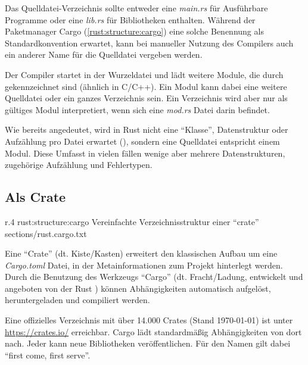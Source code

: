Das Quelldatei-Verzeichnis sollte entweder eine \textit{main.rs} für Ausführbare Programme oder eine \textit{lib.rs} für Bibliotheken enthalten.
Während der Paketmanager Cargo (\autoref{rust:structure:cargo}) eine solche Benennung als Standardkonvention erwartet, kann bei manueller Nutzung des Compilers auch ein anderer Name für die Quelldatei vergeben werden.

Der Compiler startet in der Wurzeldatei und lädt weitere Module, die durch  gekennzeichnet sind (ähnlich  in C/C++).
Ein Modul kann dabei eine weitere Quelldatei oder ein ganzes Verzeichnis sein.
Ein Verzeichnis wird aber nur als gültiges Modul interpretiert, wenn sich eine \textit{mod.rs} Datei darin befindet.

Wie bereits angedeutet, wird in Rust nicht eine \enquote{Klasse}, Datenstruktur oder Aufzählung pro Datei erwartet (), sondern eine Quelldatei entspricht einem Modul.
Diese Umfasst in vielen fällen wenige aber mehrere Datenstrukturen, zugehörige Aufzählung und Fehlertypen.

\subsection{Als Crate}
\label{rust:structure:cargo}

\begin{wrapfigure}{r}{.4\textwidth}
	\rustcincludeml
		{rust:structure:cargo}
		{Vereinfachte Verzeichnisstruktur einer \enquote{crate}}
		{sections/rust.cargo.txt}
\end{wrapfigure}



Eine \enquote{Crate} (dt. Kiste/Kasten) erweitert den klassischen Aufbau um eine \textit{Cargo.toml} Datei, in der Metainformationen zum Projekt hinterlegt werden.
Durch die Benutzung des Werkzeugs \enquote{Cargo} (dt. Fracht/Ladung, entwickelt und angeboten von der Rust ) können Abhängigkeiten automatisch aufgelöst, heruntergeladen und compiliert werden.

Eine offizielles Verzeichnis mit über 14.000 Crates (Stand \today) ist unter \url{https://crates.io/} erreichbar.
Cargo lädt standardmäßig Abhängigkeiten von dort nach.
Jeder kann neue Bibliotheken veröffentlichen.
Für den Namen gilt dabei \enquote{first come, first serve}.


